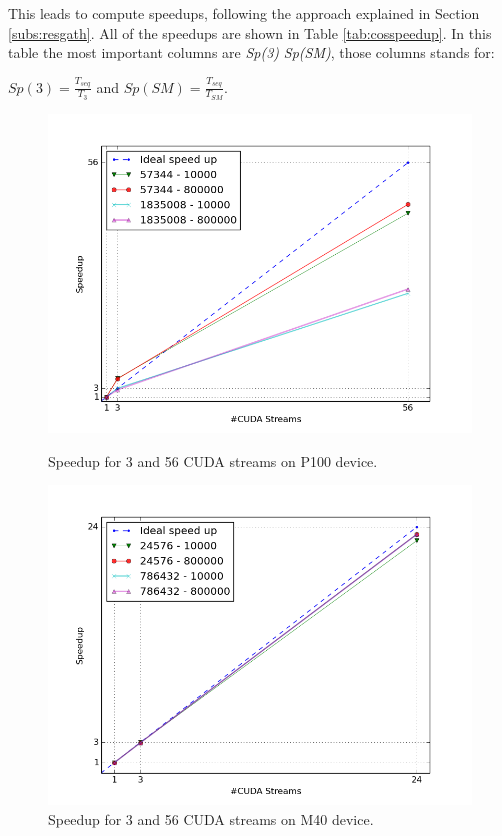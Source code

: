 			
	This leads to compute speedups, following the approach explained in Section \ref{subs:resgath}. All of the speedups are shown in Table \ref{tab:cosspeedup}. In this table the most important columns are \textit{Sp(3)} \textit{Sp(SM)}, those columns stands for:
	\begin{center}
		\(Sp(3) =  \frac{T_{seq}}{T_{3}} \)  and   
		\(Sp(SM) = \frac{T_{seq}}{T_{SM}} \).\\
	\end{center}
	
	
	\begin{figure}
		\vspace{-2cm}
		\includegraphics[scale=0.7]{plots/figure_25.png}
		\caption{Speedup for 3 and 56 CUDA streams on P100 device.}
		\label{fig:p100sp}
		\includegraphics[scale=0.7]{plots/figure_26.png}
		\caption{Speedup for 3 and 56 CUDA streams on M40 device.}
		\label{fig:m40sp}
	\end{figure}
